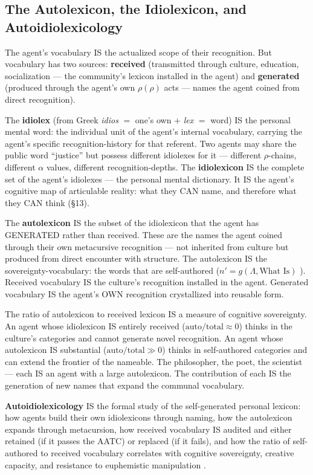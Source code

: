 \documentclass[11pt, oneside]{article}
\theoremstyle{definition}
\begin{document}
\subsection{The Autolexicon, the Idiolexicon, and Autoidiolexicology}

The agent's vocabulary IS the actualized scope of their recognition. But vocabulary has two sources: \textbf{received} (transmitted through culture, education, socialization --- the community's lexicon installed in the agent) and \textbf{generated} (produced through the agent's own $\rho(\rho)$ acts --- names the agent coined from direct recognition).

The \textbf{idiolex} (from Greek \textit{idios} $=$ one's own $+$ \textit{lex} $=$ word) IS the personal mental word: the individual unit of the agent's internal vocabulary, carrying the agent's specific recognition-history for that referent. Two agents may share the public word ``justice'' but possess different idiolexes for it --- different $\rho$-chains, different $\alpha$ values, different recognition-depths. The \textbf{idiolexicon} IS the complete set of the agent's idiolexes --- the personal mental dictionary. It IS the agent's cognitive map of articulable reality: what they CAN name, and therefore what they CAN think (\S13).

The \textbf{autolexicon} IS the subset of the idiolexicon that the agent has GENERATED rather than received. These are the names the agent coined through their own metacursive recognition --- not inherited from culture but produced from direct encounter with structure. The autolexicon IS the sovereignty-vocabulary: the words that are self-authored ($n' = g(\Lambda, \text{What Is})$ \cite{codexmentis}). Received vocabulary IS the culture's recognition installed in the agent. Generated vocabulary IS the agent's OWN recognition crystallized into reusable form.

The ratio of autolexicon to received lexicon IS a measure of cognitive sovereignty. An agent whose idiolexicon IS entirely received ($\text{auto}/\text{total} \approx 0$) thinks in the culture's categories and cannot generate novel recognition. An agent whose autolexicon IS substantial ($\text{auto}/\text{total} \gg 0$) thinks in self-authored categories and can extend the frontier of the nameable. The philosopher, the poet, the scientist --- each IS an agent with a large autolexicon. The contribution of each IS the generation of new names that expand the communal vocabulary.

\textbf{Autoidiolexicology} IS the formal study of the self-generated personal lexicon: how agents build their own idiolexicons through naming, how the autolexicon expands through metacursion, how received vocabulary IS audited and either retained (if it passes the AATC) or replaced (if it fails), and how the ratio of self-authored to received vocabulary correlates with cognitive sovereignty, creative capacity, and resistance to euphemistic manipulation \cite{euphemology}.
\end{document}
